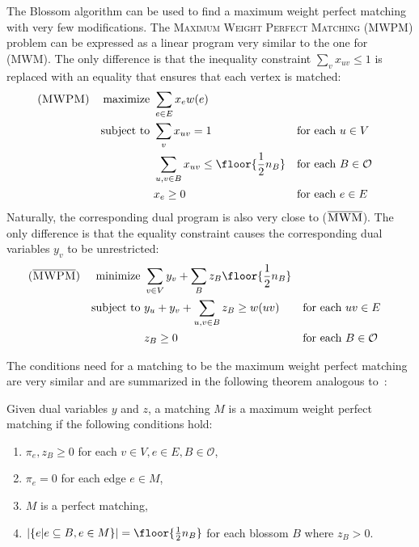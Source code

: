 The Blossom algorithm can be used to find a maximum weight perfect matching with very few modifications. The \textsc{Maximum Weight Perfect Matching} \textsc{(MWPM)} problem can be expressed as a linear program very similar to the one for \textsc{(MWM)}. The only difference is that the inequality constraint $\sum_v x_{uv} \leq 1$ is replaced with an equality that ensures that each vertex is matched:
\begin{align*}
(\textsc{MWPM})
&& \text{maximize }   & \sum_{e \in E} x_e w(e)\\
&& \text{subject to } & \sum_v x_{uv} = 1                                    && \text{for each $u \in V$} \\
&&                    & \sum_{u, v \in B} x_{uv} \leq \floor{\frac{1}{2}n_B} && \text{for each $B \in \mathcal{O}$} \\
&&                    & x_e \geq 0                                           && \text{for each $e \in E$}
\end{align*}
Naturally, the corresponding dual program is also very close to ($\overline{\textsc{MWM}}$). The only difference is that the equality constraint causes the corresponding dual variables $y_v$ to be unrestricted:
\begin{align*}
(\overline{\textsc{MWPM}})
&& \text{minimize }   & \sum_{v\in V}y_v + \sum_{B} z_B \floor{\frac{1}{2}n_B} \\
&& \text{subject to } & y_u + y_v + \sum_{u, v \in B} z_B \geq w(uv) && \text{for each $uv \in E$} \\
&&                    & z_B \geq 0                                   && \text{for each $B \in \mathcal{O}$}
\end{align*}

The conditions need for a matching to be the maximum weight perfect matching are very similar and are summarized in the following theorem analogous to~:

\begin{theorem}\label{thm:conditions_perfect}
    Given dual variables $y$ and $z$, a matching $M$ is a maximum weight perfect matching if the following conditions hold:
    
    \begin{enumerate}
        \item $\pi_{e}, z_B \geq 0$ for each $v \in V, e \in E, B \in \mathcal{O}$,
        \item $\pi_{e} = 0$ for each edge $e \in M$,
        \item $M$ is a perfect matching,
        \item $|\{e | e \subseteq B, e \in M\}| = \floor{\frac{1}{2}n_B}$ for each blossom $B$ where $z_B > 0$.
    \end{enumerate}
\end{theorem}

